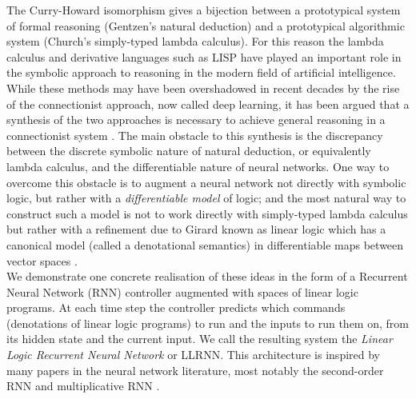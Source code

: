 \documentclass[english,letter paper,12pt,leqno]{article}
\theoremstyle{example}
\numberwithin{equation}{section}
\begin{document}
The Curry-Howard isomorphism \cite{sorensen} gives a bijection between a prototypical system of formal reasoning (Gentzen's natural deduction) and a prototypical algorithmic system (Church's simply-typed lambda calculus). For this reason the lambda calculus and derivative languages such as LISP have played an important role in the symbolic approach to reasoning in the modern field of artificial intelligence. While these methods may have been overshadowed in recent decades by the rise of the connectionist approach, now called deep learning, it has been argued that a synthesis of the two approaches is necessary to achieve general reasoning in a connectionist system \cite{minsky}. The main obstacle to this synthesis is the discrepancy between the discrete symbolic nature of natural deduction, or equivalently lambda calculus, and the differentiable nature of neural networks. One way to overcome this obstacle is to augment a neural network not directly with symbolic logic, but rather with a \emph{differentiable model} of logic; and the most natural way to construct such a model is not to work directly with simply-typed lambda calculus but rather with a refinement due to Girard known as linear logic \cite{girard} which has a canonical model (called a denotational semantics) in differentiable maps between vector spaces \cite{ehrhard-survey,blutecon,murfetclift}. 
\\

We demonstrate one concrete realisation of these ideas in the form of a Recurrent Neural Network (RNN) controller \cite{elman} augmented with spaces of linear logic programs. At each time step the controller predicts which commands (denotations of linear logic programs) to run and the inputs to run them on, from its hidden state and the current input. We call the resulting system the \emph{Linear Logic Recurrent Neural Network} or LLRNN. This architecture is inspired by many papers in the neural network literature, most notably the second-order RNN \cite{joulin} and multiplicative RNN \cite{sutskever}.

\end{document}
